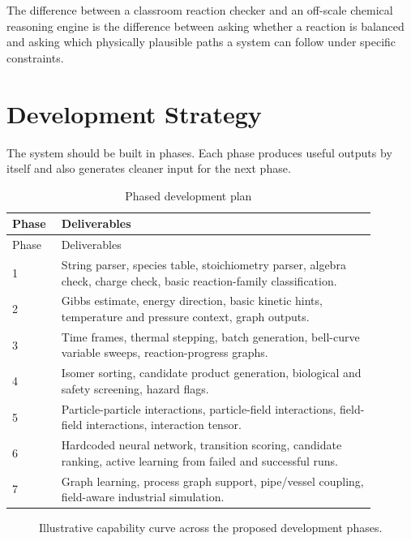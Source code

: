 \documentclass[11pt]{article}
\begin{document}
The difference between a classroom reaction checker and an off-scale chemical reasoning engine is the difference between asking whether a reaction is balanced and asking which physically plausible paths a system can follow under specific constraints.

\section{Development Strategy}

The system should be built in phases. Each phase produces useful outputs by itself and also generates cleaner input for the next phase.

\begin{longtable}{p{0.11\linewidth} p{0.78\linewidth}}
\caption{Phased development plan}\\
\toprule
Phase & Deliverables\\
\midrule
\endfirsthead
\toprule
Phase & Deliverables\\
\midrule
\endhead
1 & String parser, species table, stoichiometry parser, algebra check, charge check, basic reaction-family classification.\\
2 & Gibbs estimate, energy direction, basic kinetic hints, temperature and pressure context, graph outputs.\\
3 & Time frames, thermal stepping, batch generation, bell-curve variable sweeps, reaction-progress graphs.\\
4 & Isomer sorting, candidate product generation, biological and safety screening, hazard flags.\\
5 & Particle-particle interactions, particle-field interactions, field-field interactions, interaction tensor.\\
6 & Hardcoded neural network, transition scoring, candidate ranking, active learning from failed and successful runs.\\
7 & Graph learning, process graph support, pipe/vessel coupling, field-aware industrial simulation.\\
\bottomrule
\end{longtable}

\begin{figure}[H]
\centering
{}
\caption{Illustrative capability curve across the proposed development phases.}
\end{figure}
\end{document}
